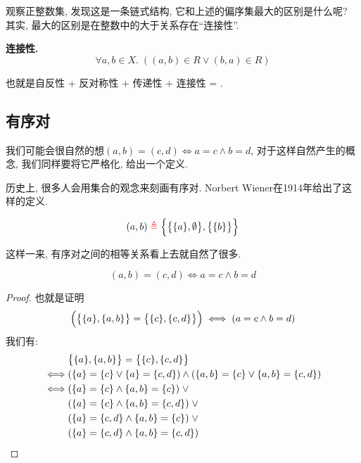 观察正整数集, 发现这是一条链式结构, 它和上述的偏序集最大的区别是什么呢? 其实, 最大的区别是在整数中的大于关系存在``连接性''. 

\textbf{连接性.} 
$$
\forall a, b \in X.\; ((a, b) \in R \lor (b, a) \in R)
$$

也就是自反性 + 反对称性 + 传递性 + 连接性 = . 

\subsection{有序对}

我们可能会很自然的想$ (a, b) = (c, d) \iff a = c \land b = d$, 对于这样自然产生的概念, 我们同样要将它严格化, 给出一个定义.  

历史上, 很多人会用集合的观念来刻画有序对. Norbert Wiener在1914年给出了这样的定义. 

\begin{definition}
    \[
      (a, b) \;\textcolor{red}{\triangleq}\; \Big\{\big\{\{a\}, \emptyset\big\}, \big\{\{b\}\big\}\Big\}
    \]
\end{definition}

这样一来, 有序对之间的相等关系看上去就自然了很多. 

\begin{theorem}
    \[
      (a, b) = (c, d) \iff a = c \land b = d
    \]
\end{theorem}
\begin{proof}
    也就是证明
    $$\Big(\big\{\{a\}, \{a, b\}\big\} = \big\{\{c\}, \{c, d\}\big\}\Big) \iff (a = c \land b = d)$$
    我们有: 
    \begin{align*}
        &\big\{\{a\}, \{a, b\}\big\} = \big\{\{c\}, \{c, d\}\big\} \\
        \iff& (\{a\} = \{c\} \lor \{a\} = \{c, d\}) \land (\{a, b\} = \{c\} \lor \{a, b\} = \{c, d\}) \\
        \iff& (\{a\} = \{c\} \land \{a, b\} = \{c\}) \;\lor \\
                         & (\{a\} = \{c\} \land \{a, b\} = \{c, d\}) \;\lor \\
                         & (\{a\} = \{c, d\} \land \{a, b\} = \{c\}) \;\lor \\
                         & (\{a\} = \{c, d\} \land \{a, b\} = \{c, d\})
      \end{align*}
    

\end{proof}

